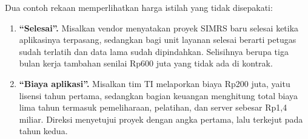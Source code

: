 Dua contoh rekaan memperlihatkan harga istilah yang tidak disepakati:

\begin{enumerate}
  \item \textbf{``Selesai''.} Misalkan vendor menyatakan proyek SIMRS baru
        selesai ketika aplikasinya terpasang, sedangkan bagi unit layanan
        selesai berarti petugas sudah terlatih dan data lama sudah
        dipindahkan. Selisihnya berupa tiga bulan kerja tambahan senilai
        Rp600 juta yang tidak ada di kontrak.
  \item \textbf{``Biaya aplikasi''.} Misalkan tim TI melaporkan biaya Rp200
        juta, yaitu lisensi tahun pertama, sedangkan bagian keuangan
        menghitung total biaya lima tahun termasuk pemeliharaan, pelatihan,
        dan server sebesar Rp1,4 miliar. Direksi menyetujui proyek dengan
        angka pertama, lalu terkejut pada tahun kedua.
\end{enumerate}

